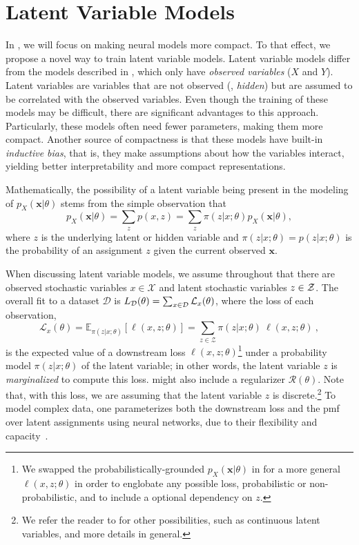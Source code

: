 \section{Latent Variable Models}
\label{sec:lvm}

\noindent In , we will focus on making
neural models more compact. To that effect, we propose a novel way to
train latent variable models. Latent variable models differ from the
models described in , which only have
\textit{observed variables} ($X$ and $Y$). Latent variables are
variables that are not observed (\ie, \textit{hidden}) but are assumed
to be correlated with the observed variables. Even though the
training of these models may be difficult, there are significant
advantages to this approach. Particularly, these models often need
fewer parameters, making them more compact. Another source of
compactness is that these models have built-in \textit{inductive
    bias}, that is, they make assumptions about how the variables
interact, yielding better interpretability and more compact
representations.

Mathematically, the possibility of a latent variable being present
in the modeling of $p_X(\bm{x}|\theta)$ stems from the simple
observation that
%
\begin{equation}\label{eq:lvm}
    p_X(\bm{x}|\theta) = \sum_z p(x, z) = \sum_z \pi(z|x; \theta) p_X(\bm{x}|\theta),
\end{equation}
%
where $z$ is the underlying latent or hidden variable and $\pi(z|x; \theta) = p(z|x; \theta)$ is the
probability of an assignment $z$ given the current observed $\bm{x}$.

When discussing latent variable models, we assume throughout that there are observed stochastic variables
$x \in \mathcal{X}$ and latent stochastic variables $z \in \mathcal{Z}$. The
overall fit to a dataset $\mathcal D$ is $L_\mathcal{D}(\theta) =
    \sum_{x \in \mathcal{D}} \mathcal{L}_x(\theta)$, where the loss of each
observation,
%
\begin{equation}\label{eq:fit}
    \mathcal{L}_{x}(\theta) =
    \mathbb E_{\pi(z|x; \theta)}
    \left[ \ell(x, z; \theta)\right] =
    \sum_{z \in \mathcal Z} \pi(z | x; \theta)~\ell(x, z; \theta) ~,
\end{equation}
%
is the expected value of a downstream loss $\ell(x,z;\theta)$\footnote{
    We swapped the probabilistically-grounded $p_X(\bm{x}|\theta)$ in 
    for a more general $\ell(x,z;\theta)$ in order
    to englobate any possible loss, probabilistic or non-probabilistic,
    and to include a optional dependency on $z$.
}
under a
probability model $\pi(z|x;\theta)$ of the latent variable; in other
words, the latent variable $z$ is {\it marginalized} to compute this loss.
 might also include a regularizer $\mathcal{R}(\theta)$.
Note that, with this loss, we are assuming that the latent variable $z$ is discrete.\footnote{We refer the reader
    to \citet{Kim2018} for other possibilities, such as continuous latent variables, and more
    details in general.}
To model complex data, one parameterizes both the downstream loss and
the pmf over latent assignments using neural networks, due
to their flexibility and capacity~\citep{Kingma+2014:VAE}.

